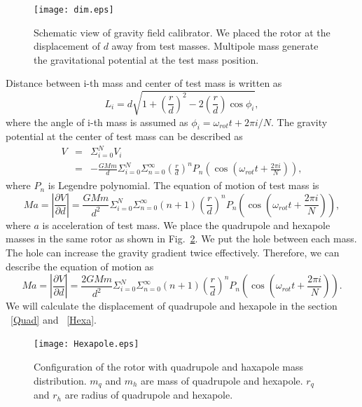 \documentclass[A4]{spie}  %
\begin{document}
\begin{figure}
\begin{center}
\texttt{[image: dim.eps]}
\caption{Schematic view of gravity field calibrator. We placed the rotor at the displacement of $d$ away from test masses. Multipole mass generate the gravitational potential at the test mass position.}
\label{fig:dim}
\end{center}
\end{figure}

Distance between i-th mass and center of test mass is written as
\begin{equation}
L_i=d \sqrt{1+\left( \frac{r}{d} \right)^2 -2\left( \frac{r}{d} \right) \cos{\phi_i} },
\end{equation}
where the angle of i-th mass is assumed as $\phi_i=\omega_{rot} t + 2\pi i/N$.
The gravity potential at the center of test mass can be described as
\begin{eqnarray}
V &=& \Sigma^N_{i=0} V_i \\
&=&-\frac{GMm}{d} \Sigma^N_{i=0} \Sigma^{\infty}_{n=0} \left( \frac{r}{d} \right)^n P_n\left(\cos{\left(\omega_{rot} t +\frac{2 \pi i}{N}\right)}\right),
\end{eqnarray}
where $P_n$ is Legendre polynomial. The equation of motion of test mass is 
\begin{equation}
Ma=\left| \frac{\partial V}{\partial{d}} \right| =\frac{GMm}{d^2}\Sigma^N_{i=0} \Sigma^{\infty}_{n=0}(n+1) \left( \frac{r}{d} \right)^n P_n\left(\cos{\left(\omega_{rot} t +\frac{2 \pi i}{N}\right)}\right),
\end{equation}
where $a$ is acceleration of test mass. We place the quadrupole and hexapole masses in the same rotor as shown in Fig.~\ref{fig:hex}. We put the hole between each mass. The hole can increase the gravity gradient twice effectively. Therefore, we can describe the equation of motion as 
\begin{equation}
Ma=\left| \frac{\partial V}{\partial{d}} \right| =\frac{2GMm}{d^2}\Sigma^N_{i=0} \Sigma^{\infty}_{n=0}(n+1) \left( \frac{r}{d} \right)^n P_n\left(\cos{\left(\omega_{rot} t +\frac{2 \pi i}{N}\right)}\right). \label{eq:EOM}
\end{equation}
We will calculate the displacement of quadrupole and hexapole in the section ~\ref{Quad}  and ~\ref{Hexa}.

\begin{figure}
\begin{center}
\texttt{[image: Hexapole.eps]}
\caption{Configuration of the rotor with quadrupole and haxapole mass distribution. $m_q$ and $m_h$ are mass of quadrupole and hexapole. $r_q$ and $r_h$ are radius of quadrupole and hexapole.}
\label{fig:hex}
\end{center}
\end{figure}
\end{document}
